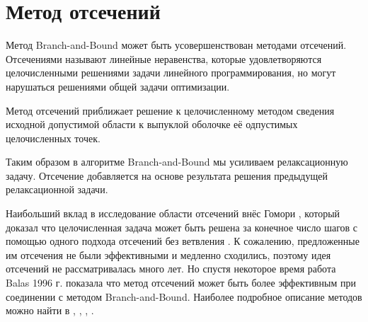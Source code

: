\documentclass[a4paper,14pt,russian]{extreport}
\begin{document}
\section{Метод отсечений}

Метод Branch-and-Bound может быть усовершенствован методами отсечений. Отсечениями называют линейные неравенства, которые удовлетворяются целочисленными решениями задачи линейного программирования, но могут нарушаться решениями общей задачи оптимизации. \par Метод отсечений приближает решение к целочисленному методом сведения исходной допустимой области к выпуклой оболочке её одпустимых целочисленных точек. 
\par Таким образом в алгоритме Branch-and-Bound мы усиливаем релаксационную задачу. Отсечение добавляется на основе результата решения предыдущей релаксационной задачи.
\par Наибольший вклад в исследование области отсечений внёс Гомори \cite{gomory_1}, который доказал что целочисленная задача может быть решена за конечное число шагов с помощью одного подхода отсечений без ветвления \cite{gomory}. К сожалению, предложенные им отсечения не были эффективными и медленно сходились, поэтому идея отсечений не рассматривалась много лет. Но спустя некоторое время работа Balas \cite{balas_ceria_corn_natraj} 1996 г. показала что метод отсечений может быть более эффективным при соединении с методом Branch-and-Bound. Наиболее подробное описание методов можно найти в \cite{klar}, \cite{wolter}, \cite{marchand}, \cite{fuegenschuh}.
\end{document}
